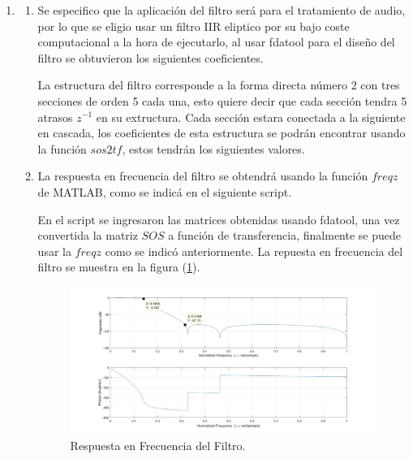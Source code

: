\documentclass[12pt]{article}
\begin{document}
\begin{enumerate}
\begin{enumerate}
    \end{enumerate}
    \item 
    \begin{enumerate}
        \item Se especifico que la aplicación del filtro será para el tratamiento de audio, por lo que se eligio usar un filtro IIR eliptico por su bajo coste computacional a la hora de ejecutarlo, al usar fdatool para el diseño del filtro se obtuvieron los siguientes coeficientes.
        
        La estructura del filtro corresponde a la forma directa número 2
        con tres secciones de orden 5 cada una, esto quiere decir que cada sección tendra 5 atrasos $z^{-1}$ en su extructura. Cada sección estara conectada a la siguiente en cascada, los coeficientes de esta estructura se podrán encontrar usando la función $sos2tf$, estos tendrán los siguientes valores. 
        
        \item La respuesta en frecuencia del filtro se obtendrá usando la función $freqz $ de MATLAB, como se indicá en el siguiente script.
        
        En el script se ingresaron las matrices obtenidas usando fdatool, una vez convertida la matriz $SOS$ a función de transferencia, finalmente se puede usar la $freqz$ como se indicó anteriormente.
        La repuesta en frecuencia del filtro se muestra en la figura (\ref{fig:freq_resp}).
        
        \begin{figure}[h]    
            \centering
            \includegraphics[width=15cm]{iir_filter.jpg}
            \caption{Respuesta en Frecuencia del Filtro.}
            \label{fig:freq_resp}
        \end{figure}
        

\end{enumerate}
\end{enumerate}
\end{document}
